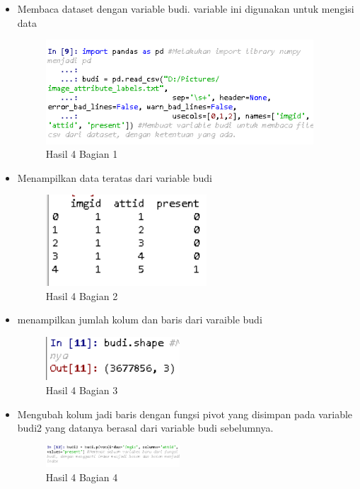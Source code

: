 \begin{itemize}
\item Membaca dataset dengan variable budi. variable ini digunakan untuk mengisi data

\begin{figure}[H]
\centerline{\includegraphics[width=10cm]{figures/1174079/3/praktek3.PNG}}
\caption{Hasil 4 Bagian 1}
\label{labelgambar}
\end{figure}

\item Menampilkan data teratas dari variable budi

\begin{figure}[H]
\centerline{\includegraphics[width=6cm]{figures/1174079/3/praktek4.PNG}}
\caption{Hasil 4 Bagian 2}
\label{labelgambar}
\end{figure}

\item menampilkan jumlah kolum dan baris dari varaible budi

\begin{figure}[H]
\centerline{\includegraphics[width=5cm]{figures/1174079/3/praktek5.PNG}}
\caption{Hasil 4 Bagian 3}
\label{labelgambar}
\end{figure}

\item Mengubah kolum jadi baris dengan fungsi pivot yang disimpan pada variable budi2 yang datanya berasal dari variable budi sebelumnya.

\begin{figure}[H]
\centerline{\includegraphics[width=5cm]{figures/1174079/3/praktek6.PNG}}
\caption{Hasil 4 Bagian 4}
\label{labelgambar}
\end{figure}


\end{itemize}
